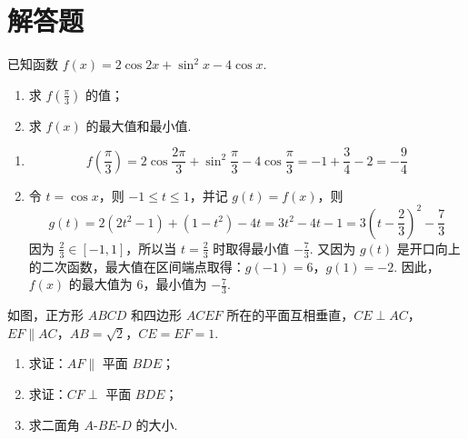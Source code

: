 \section{解答题}

\begin{problem}
已知函数 \( f(x) = 2\cos 2x + \sin^2 x - 4\cos x \).
\begin{enumerate}
\item 求 \( f\left(\frac{\pi}{3}\right) \) 的值；
\item 求 \( f(x) \) 的最大值和最小值.
\end{enumerate}
\end{problem}

\begin{solution}
\begin{enumerate}
\item
\[
f\left(\frac{\pi}{3}\right)=2\cos\frac{2\pi}{3}+\sin^{2}\frac{\pi}{3}-4\cos\frac{\pi}{3}=-1+\frac{3}{4}-2=-\frac{9}{4}
\]

\item 令 \(t=\cos x\)，则 \(-1\leqslant t\leqslant 1\)，并记 \(g(t)=f(x)\)，则
\[
g(t)=2\left(2t^{2}-1\right)+\left(1-t^{2}\right)-4t=3t^{2}-4t-1=3\left(t-\frac{2}{3}\right)^{2}-\frac{7}{3}
\]
因为 \(\frac{2}{3}\in[-1,1]\)，所以当 \(t=\frac{2}{3}\) 时取得最小值 \(-\frac{7}{3}\). 又因为 \(g(t)\) 是开口向上的二次函数，最大值在区间端点取得：\(g(-1)=6\)，\(g(1)=-2\). 因此，\(f(x)\) 的最大值为 \(6\)，最小值为 \(-\frac{7}{3}\).
\end{enumerate}
\end{solution}

\begin{problem}
如图，正方形 \(ABCD\) 和四边形 \(ACEF\) 所在的平面互相垂直，\(CE \perp AC\)，\(EF \parallel AC\)，\(AB = \sqrt{2}\)，\(CE = EF = 1\).

\begin{enumerate}
\item 求证：\(AF \parallel\) 平面 \(BDE\)；
\item 求证：\(CF \perp\) 平面 \(BDE\)；
\item 求二面角 \(A\)-\(BE\)-\(D\) 的大小.
\end{enumerate}

\end{problem}

